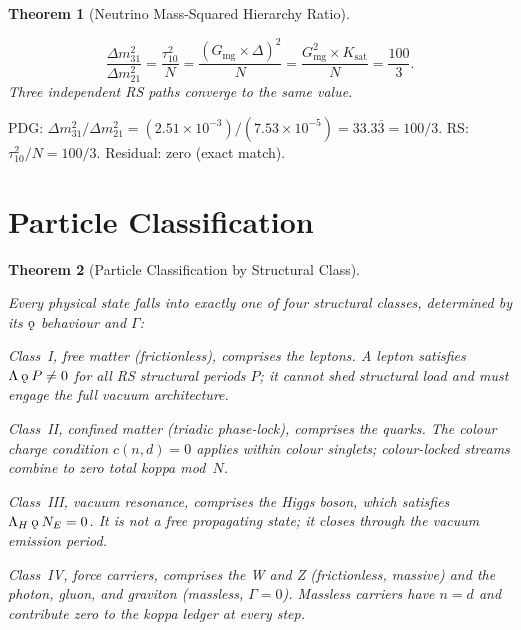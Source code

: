 \documentclass[11pt,letterpaper]{article}
\theoremstyle{plain}
\newtheorem{theorem}{Theorem}[section]
\theoremstyle{definition}
\theoremstyle{remark}
\newcommand{\koppa}{\mathbin{\text{\rm\k{o}}}}
\newcommand{\Tcharge}{\Gamma}
\newcommand{\Gmg}{G_{\mathrm{mg}}}
\newcommand{\Ksat}{K_{\mathrm{sat}}}
\newcommand{\tauX}{\tau_{10}}
\newcommand{\LambdaH}{\Lambda_H}
\begin{document}
\begin{theorem}[Neutrino Mass-Squared Hierarchy
Ratio]\label{thm:nu-ratio}
\begin{rsbox}
\[
\frac{\Delta m^2_{31}}{\Delta m^2_{21}}
=\frac{\tauX^2}{N}=\frac{(\Gmg\times\Delta)^2}{N}
=\frac{\Gmg^2\times\Ksat}{N}=\frac{100}{3}.
\]
Three independent RS paths converge to the same value.
\end{rsbox}
\end{theorem}

\begin{verifybox}
PDG: $\Delta m^2_{31}/\Delta m^2_{21}
=(2.51\times10^{-3})/(7.53\times10^{-5})=33.3\overline{3}=100/3$.
RS: $\tauX^2/N=100/3$.  Residual: zero (exact match).
\end{verifybox}

\section{Particle Classification}\label{sec:classification}

\begin{theorem}[Particle Classification by Structural
Class]\label{thm:class}
\begin{rsbox}
Every physical state falls into exactly one of four structural
classes, determined by its $\koppa$ behaviour and $\Tcharge$:

Class~I, free matter (frictionless), comprises the leptons. A lepton satisfies $\Lambda\koppa P\neq0$ for all RS structural periods $P$; it cannot shed structural load and must engage the full vacuum architecture.

Class~II, confined matter (triadic phase-lock), comprises the quarks. The colour charge condition $c(n,d)=0$ applies within colour singlets; colour-locked streams combine to zero total koppa mod~$N$.

Class~III, vacuum resonance, comprises the Higgs boson, which satisfies $\LambdaH\koppa N_E=0$. It is not a free propagating state; it closes through the vacuum emission period.

Class~IV, force carriers, comprises the W and Z (frictionless, massive) and the photon, gluon, and graviton (massless, $\Tcharge=0$). Massless carriers have $n=d$ and contribute zero to the koppa ledger at every step.
\end{rsbox}
\end{theorem}
\end{document}
